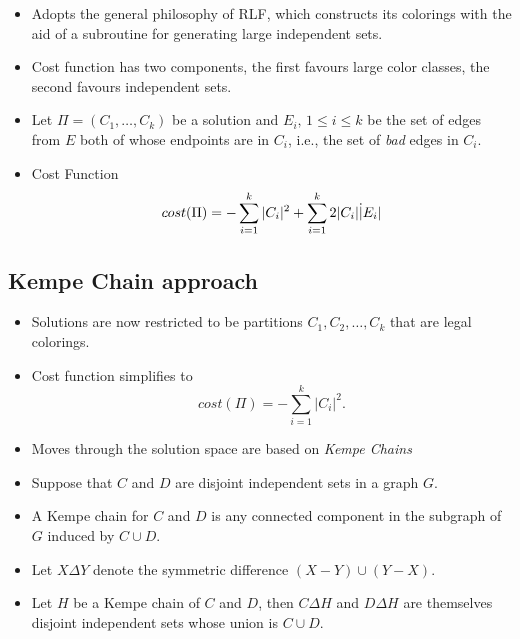 \begin{itemize}
	\item Adopts the general philosophy of RLF, which constructs its colorings with the aid of a subroutine for generating large independent sets.
	\item Cost function has two components, the first favours large color classes, the second favours independent sets.
	\item Let $\Pi = (C_1,\ldots,C_k)$ be a solution and $E_i, \, 1 \leq i \leq k$ be the set of edges from $E$ both of whose endpoints are in $C_i$, i.e., the set of \emph{bad} edges in $C_i$.
	\item Cost Function
		\begin{equation*}
		\centering
		cost(\Pi) = - \displaystyle \sum_{i=1}^{k} |C_i|^2 + \sum_{i=1}^{k} 2|C_i| \dot |E_i|
		\end{equation*}
	\end{itemize}

\subsection{Kempe Chain approach}

\begin{itemize}
\item Solutions are now restricted to be partitions $C_1,C_2,\ldots,C_k$ that are legal colorings.
\item Cost function simplifies to
\begin{equation*}
cost(\Pi) = - \displaystyle \sum_{i=1}^{k} |C_i|^2.
\end{equation*}
\item Moves through the solution space are based on \emph{Kempe Chains}
\end{itemize}

\begin{itemize}
	\item Suppose that $C$ and $D$ are disjoint independent sets in a graph $G$.
	\item A Kempe chain for $C$ and $D$ is any connected component in the subgraph of $G$ induced by $C \cup D$.
	\item Let $X \Delta Y$ denote the symmetric difference $(X-Y)\cup(Y-X)$.
	\item Let $H$ be a Kempe chain of $C$ and $D$, then $C \Delta H$ and $D \Delta H$ are themselves disjoint independent sets whose union is $C \cup D$.
\end{itemize}

